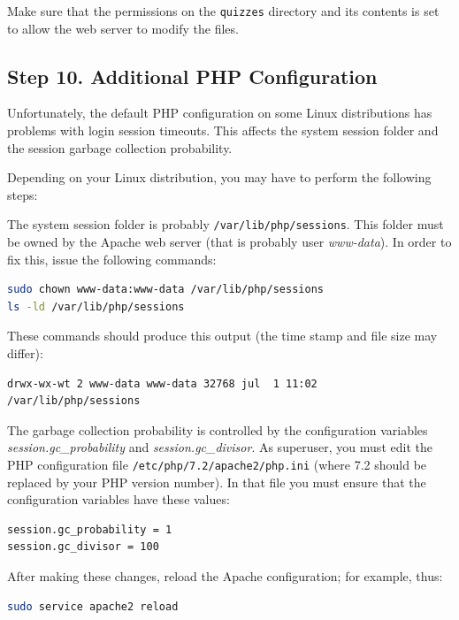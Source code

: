 \documentclass[11pt,oneside,a4paper]{memoir}
\begin{document}
Make sure that the permissions on the \texttt{quizzes} directory and its contents is set to allow
the web server to modify the files.

\subsection{Step 10. Additional PHP Configuration}

Unfortunately, the default PHP configuration on some Linux distributions has problems with login
session timeouts. This affects the system session folder and the session garbage
collection probability.

Depending on your Linux distribution, you may have to perform the following steps:

The system session folder is probably \texttt{/var/lib/php/sessions}. This folder must be owned by
the Apache web server (that is probably user \emph{www-data}). In order to fix this, issue the
following commands:

\begin{lstlisting}[language=bash]
sudo chown www-data:www-data /var/lib/php/sessions
ls -ld /var/lib/php/sessions
\end{lstlisting}

These commands should produce this output (the time stamp and file size may differ):

\begin{lstlisting}
drwx-wx-wt 2 www-data www-data 32768 jul  1 11:02 /var/lib/php/sessions
\end{lstlisting}


The garbage collection probability is controlled by the configuration variables
\emph{session.gc\_probability} and \emph{session.gc\_divisor}. As superuser, you must edit the PHP
configuration file \texttt{/etc/php/7.2/apache2/php.ini} (where 7.2 should be replaced by your PHP
version number). In that file you must ensure that the configuration variables have these values:

\begin{lstlisting}
session.gc_probability = 1
session.gc_divisor = 100
\end{lstlisting}

After making these changes, reload the Apache configuration; for example, thus:

\begin{lstlisting}[language=bash]
sudo service apache2 reload
\end{lstlisting}
\end{document}

